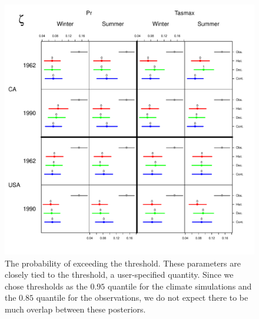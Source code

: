 \begin{figure}
\begin{center}
 \includegraphics[scale=0.61]{figs/zeta.pdf}
\end{center}
\caption{The probability of exceeding the threshold. These parameters are closely tied to the threshold, a user-specified quantity. Since we chose thresholds as the $0.95$ quantile for the climate simulations and the $0.85$ quantile for the observations, we do not expect there to be much overlap between these posteriors.}
\label{zeta}
\end{figure}

